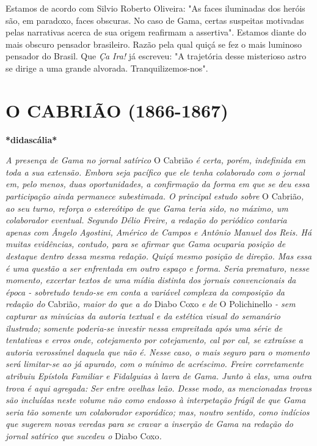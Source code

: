 Estamos de acordo com Silvio Roberto Oliveira: "As faces iluminadas dos
heróis são, em paradoxo, faces obscuras. No caso de Gama, certas
suspeitas motivadas pelas narrativas acerca de sua origem reafirmam a
assertiva". Estamos diante do mais obscuro pensador brasileiro. Razão
pela qual quiçá se fez o mais luminoso pensador do Brasil. Que \emph{Ça
Ira!} já escreveu: "A trajetória desse misterioso astro se dirige a uma
grande alvorada. Tranquilizemos-nos".

\part{O CABRIÃO (1866-1867)}

\textbf{*didascália*}

\emph{A presença de Gama no jornal satírico} O Cabrião \emph{é certa,
porém, indefinida em toda a sua extensão. Embora seja pacífico que ele
tenha colaborado com o jornal em, pelo menos, duas oportunidades, a
confirmação da forma em que se deu essa participação ainda permanece
subestimada. O principal estudo sobre} O Cabrião\emph{, ao seu turno,
reforça o estereótipo de que Gama teria sido, no máximo, um colaborador
eventual. Segundo Délio Freire, a redação do periódico contaria apenas
com Ângelo Agostini, Américo de Campos e Antônio Manuel dos Reis. Há
muitas evidências, contudo, para se afirmar que Gama ocuparia posição de
destaque dentro dessa mesma redação. Quiçá mesmo posição de direção. Mas
essa é uma questão a ser enfrentada em outro espaço e forma. Seria
prematuro, nesse momento, excertar textos de uma mídia distinta dos
jornais convencionais da época - sobretudo tendo-se em conta a variável
complexa da composição da redação do} Cabrião\emph{, maior do que a do}
Diabo Coxo \emph{e de} O Polichinello \emph{- sem capturar as minúcias
da autoria textual e da estética visual do semanário ilustrado; somente
poderia-se investir nessa empreitada após uma série de tentativas e
erros onde, cotejamento por cotejamento, cal por cal, se extraísse a
autoria verossímel daquela que não é. Nesse caso, o mais seguro para o
momento será limitar-se ao já apurado, com o mínimo de acréscimo. Freire
corretamente atribuiu Epístola Familiar e Fidalguias à lavra de Gama.
Junto à elas, uma outra trova é aqui agregada: Ser entre ovelhas leão.
Desse modo, as mencionadas trovas são incluídas neste volume não como
endosso à interpetação frágil de que Gama seria tão somente um
colaborador esporádico; mas, noutro sentido, como indícios que sugerem
novas veredas para se cravar a inserção de Gama na redação do jornal
satírico que sucedeu o} Diabo Coxo\emph{.}

